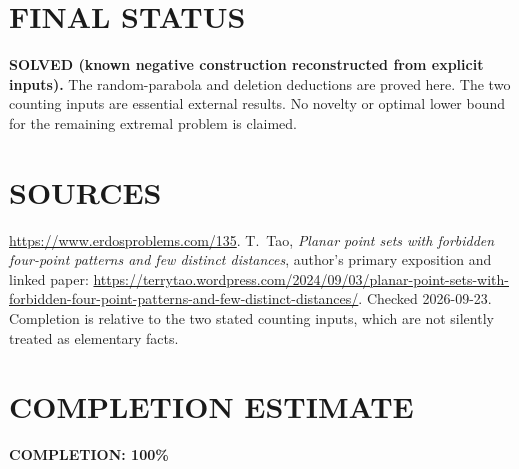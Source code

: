 \section{FINAL STATUS}
\textbf{SOLVED (known negative construction reconstructed from explicit inputs).}
The random-parabola and deletion deductions are proved here. The two
counting inputs are essential external results. No novelty or optimal
lower bound for the remaining extremal problem is claimed.

\section{SOURCES}
\url{https://www.erdosproblems.com/135}.
T.~Tao, \emph{Planar point sets with forbidden four-point patterns and
few distinct distances}, author's primary exposition and linked paper:
\url{https://terrytao.wordpress.com/2024/09/03/planar-point-sets-with-forbidden-four-point-patterns-and-few-distinct-distances/}.
Checked 2026-09-23. Completion is relative to the two stated counting
inputs, which are not silently treated as elementary facts.

\section{COMPLETION ESTIMATE}
\textbf{COMPLETION: 100\%}
